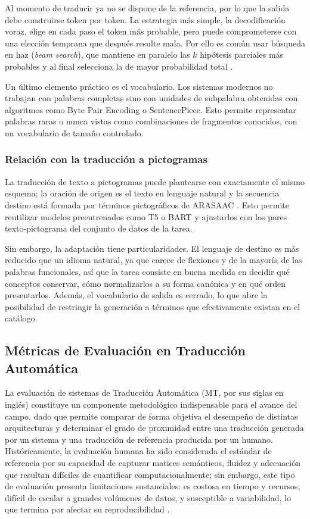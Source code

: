 Al momento de traducir ya no se dispone de la referencia, por lo que la salida debe construirse token por token. La estrategia más simple, la decodificación voraz, elige en cada paso el token más probable, pero puede comprometerse con una elección temprana que después resulte mala. Por ello es común usar búsqueda en haz (\textit{beam search}), que mantiene en paralelo las $k$ hipótesis parciales más probables y al final selecciona la de mayor probabilidad total \cite{sutskever2014sequence}.

Un último elemento práctico es el vocabulario. Los sistemas modernos no trabajan con palabras completas sino con unidades de subpalabra obtenidas con algoritmos como Byte Pair Encoding \cite{sennrich2016bpe} o SentencePiece. Esto permite representar palabras raras o nunca vistas como combinaciones de fragmentos conocidos, con un vocabulario de tamaño controlado.


\subsubsection{Relación con la traducción a pictogramas}

La traducción de texto a pictogramas puede plantearse con exactamente el mismo esquema: la oración de origen es el texto en lenguaje natural y la secuencia destino está formada por términos pictográficos de ARASAAC \cite{macaire2025overview}. Esto permite reutilizar modelos preentrenados como T5 o BART y ajustarlos con los pares texto-pictograma del conjunto de datos de la tarea.

Sin embargo, la adaptación tiene particularidades. El lenguaje de destino es más reducido que un idioma natural, ya que carece de flexiones y de la mayoría de las palabras funcionales, así que la tarea consiste en buena medida en decidir qué conceptos conservar, cómo normalizarlos a su forma canónica y en qué orden presentarlos. Además, el vocabulario de salida es cerrado, lo que abre la posibilidad de restringir la generación a términos que efectivamente existan en el catálogo.


\subsection{Métricas de Evaluación en Traducción Automática}
La evaluación de sistemas de Traducción Automática (MT, por sus siglas en inglés) constituye un componente metodológico indispensable para el avance del campo, dado que permite comparar de forma objetiva el desempeño de distintas arquitecturas y determinar el grado de proximidad entre una traducción generada por un sistema y una traducción de referencia producida por un humano. Históricamente, la evaluación humana ha sido considerada el estándar de referencia por su capacidad de capturar matices semánticos, fluidez y adecuación que resultan difíciles de cuantificar computacionalmente; sin embargo, este tipo de evaluación presenta limitaciones sustanciales: es costosa en tiempo y recursos, difícil de escalar a grandes volúmenes de datos, y susceptible a variabilidad, lo que termina por afectar su reproducibilidad \cite{lee2023survey}.

